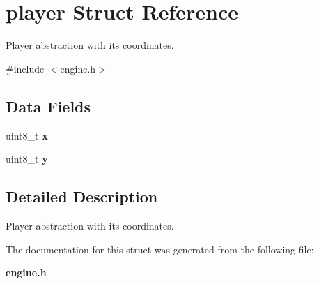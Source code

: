 \section{player Struct Reference}
\label{structplayer}


Player abstraction with its coordinates.  




{\ttfamily \#include $<$engine.\+h$>$}

\subsection*{Data Fields}
\begin{DoxyCompactItemize}
\item 
uint8\+\_\+t {\bfseries x}\label{structplayer_a0f561e77fa0f040b637f4e04f6cd8078}

\item 
uint8\+\_\+t {\bfseries y}\label{structplayer_a17f97f62d93bc8cfb4a2b5d273a2aa72}

\end{DoxyCompactItemize}


\subsection{Detailed Description}
Player abstraction with its coordinates. 

The documentation for this struct was generated from the following file\+:\begin{DoxyCompactItemize}
\item 
{\bf engine.\+h}\end{DoxyCompactItemize}
